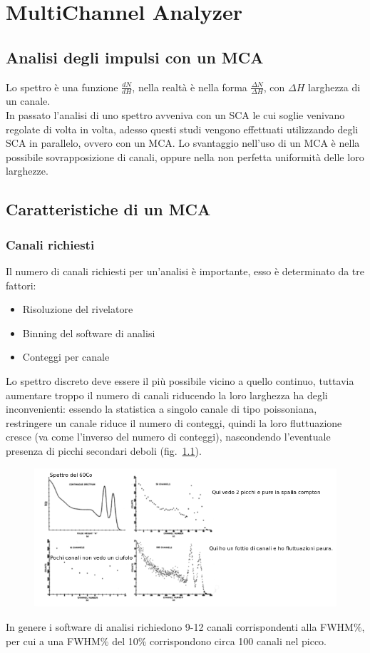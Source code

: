 \chapter{MultiChannel Analyzer}
\section{Analisi degli impulsi con un MCA}
Lo spettro \`e una funzione $\frac{dN}{dH}$, nella realt\`a \`e nella forma $\frac{\Delta N}{\Delta H}$, con $\Delta H$ larghezza di un canale.\\
In passato l'analisi di uno spettro avveniva con un SCA le cui soglie venivano regolate di volta in volta, adesso questi studi vengono effettuati
utilizzando degli SCA in parallelo, ovvero con un MCA.
Lo svantaggio nell'uso di un MCA \`e nella possibile sovrapposizione di canali, oppure nella non perfetta uniformit\`a delle loro larghezze.
\section{Caratteristiche di un MCA}
\subsection{Canali richiesti}
Il numero di canali richiesti per un'analisi \`e importante, esso \`e determinato da tre fattori:
\begin{itemize}
\item Risoluzione del rivelatore
\item Binning del software di analisi
\item Conteggi per canale
\end{itemize}
Lo spettro discreto deve essere il pi\`u possibile vicino a quello continuo, tuttavia aumentare troppo il numero di canali
riducendo la loro larghezza ha degli inconvenienti: essendo la statistica a singolo canale di tipo poissoniana, restringere un canale
riduce il numero di conteggi, quindi la loro fluttuazione cresce (va come l'inverso del numero di conteggi), nascondendo l'eventuale
presenza di picchi secondari deboli (fig.~\ref{fig:binningMCA}). 
\begin{figure}[htbp]
\begin{center}
	\includegraphics[scale=0.7]{./Immagini/BinningMCA.png}
\label{fig:binningMCA}
\end{center}
\end{figure}
In genere i software di analisi richiedono 9-12 canali corrispondenti alla FWHM\%, per cui a una FWHM\% del 10\% corrispondono circa 100 canali nel picco.
